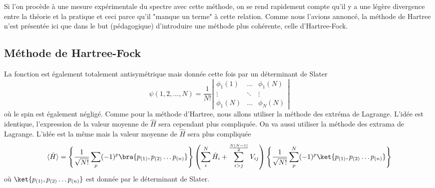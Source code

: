 Si l'on procède à une mesure expérimentale du spectre avec cette méthode, on se rend rapidement compte qu'il y a une légère divergence entre la théorie et la pratique et ceci parce qu'il "manque un terme" à cette relation. Comme nous l'avions annoncé, la méthode de Hartree n'est présentée ici que dans le but (pédagogique) d'introduire une méthode plus cohérente, celle d'Hartree-Fock.


\subsection{Méthode de Hartree-Fock}
La fonction est également totalement antisymétrique mais donnée cette fois par un déterminant de Slater 
\begin{equation}
\psi(1,2,\dots, N) = \frac{1}{N!}\left|\begin{array}{ccc}
\phi_1(1)&\dots&\phi_1(N)\\
\vdots&\ddots&\vdots\\
\phi_1(N)&\dots&\phi_N(N)
\end{array}\right|
\end{equation}
où le spin est également négligé. Comme pour la méthode d'Hartree, nous allons utiliser la méthode des extréma de 
Lagrange. L'idée est identique, l'expression de la valeur moyenne de $\hat{H}$ sera cependant plus compliquée.
On va aussi utiliser la méthode des extrama de Lagrange. L'idée est la même mais la valeur moyenne de $\hat H$ sera plus compliquée
\begin{equation}
\langle\hat{H}\rangle = \left\{\frac{1}{\sqrt{N!}}\sum_p(-1)^p \bra{p_{(1)},p_{(2)}\dots p_{(n)}}\right\}\left(
\sum_i^N \hat{H}_i+\sum_{i>j}^{\frac{N(N-1)}{2}} V_{ij}\right)\left\{\frac{1}{\sqrt{N!}}\sum_p^N (-1)^p
\ket{p_{(1)},p_{(2)}\dots p_{(n)}}\right\}
\end{equation}
où $\ket{p_{(1)},p_{(2)}\dots p_{(n)}}$ est donnée par le déterminant de Slater. \\

